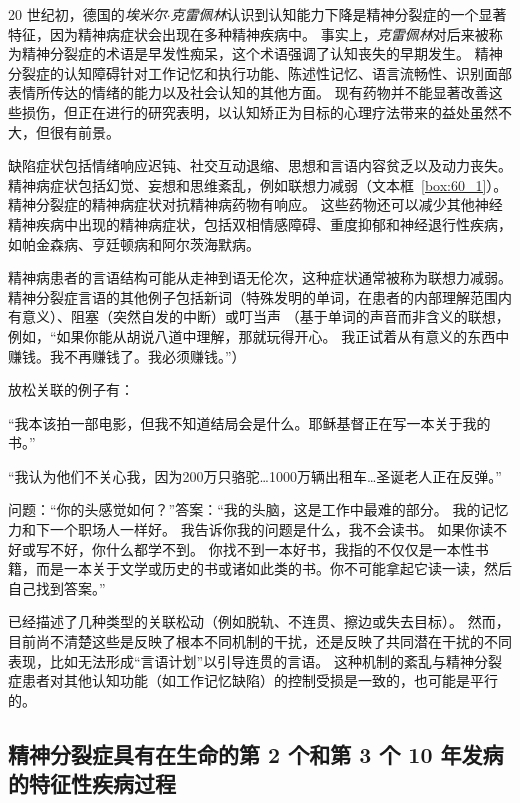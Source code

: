 20 世纪初，德国的\textit{埃米尔$\cdot$克雷佩林}认识到认知能力下降是精神分裂症的一个显著特征，因为精神病症状会出现在多种精神疾病中。
事实上，\textit{克雷佩林}对后来被称为精神分裂症的术语是早发性痴呆，这个术语强调了认知丧失的早期发生。
精神分裂症的认知障碍针对工作记忆和执行功能、陈述性记忆、语言流畅性、识别面部表情所传达的情绪的能力以及社会认知的其他方面。
现有药物并不能显著改善这些损伤，但正在进行的研究表明，以认知矫正为目标的心理疗法带来的益处虽然不大，但很有前景。


缺陷症状包括情绪响应迟钝、社交互动退缩、思想和言语内容贫乏以及动力丧失。
精神病症状包括幻觉、妄想和思维紊乱，例如联想力减弱（文本框~\ref{box:60_1}）。
精神分裂症的精神病症状对抗精神病药物有响应。
这些药物还可以减少其他神经精神疾病中出现的精神病症状，包括双相情感障碍、重度抑郁和神经退行性疾病，如帕金森病、亨廷顿病和阿尔茨海默病。


\begin{proposition}[思维障碍] \label{box:60_1}
	
	\quad \quad 精神病患者的言语结构可能从走神到语无伦次，这种症状通常被称为联想力减弱。
	精神分裂症言语的其他例子包括新词（特殊发明的单词，在患者的内部理解范围内有意义）、阻塞（突然自发的中断）或叮当声
   （基于单词的声音而非含义的联想，例如，“如果你能从胡说八道中理解，那就玩得开心。
	我正试着从有意义的东西中赚钱。我不再赚钱了。我必须赚钱。”）
	
	\quad \quad 放松关联的例子有：
	
	\quad \quad “我本该拍一部电影，但我不知道结局会是什么。耶稣基督正在写一本关于我的书。”
	
	\quad \quad “我认为他们不关心我，因为200万只骆驼…1000万辆出租车…圣诞老人正在反弹。”
	
	\quad \quad 问题：“你的头感觉如何？”答案：“我的头脑，这是工作中最难的部分。
	我的记忆力和下一个职场人一样好。
	我告诉你我的问题是什么，我不会读书。
	如果你读不好或写不好，你什么都学不到。
	你找不到一本好书，我指的不仅仅是一本性书籍，而是一本关于文学或历史的书或诸如此类的书。你不可能拿起它读一读，然后自己找到答案。”
	
	\quad \quad 已经描述了几种类型的关联松动（例如脱轨、不连贯、擦边或失去目标）。
	然而，目前尚不清楚这些是反映了根本不同机制的干扰，还是反映了共同潜在干扰的不同表现，比如无法形成“言语计划”以引导连贯的言语。
	这种机制的紊乱与精神分裂症患者对其他认知功能（如工作记忆缺陷）的控制受损是一致的，也可能是平行的。

\end{proposition}




\subsection{精神分裂症具有在生命的第 2 个和第 3 个 10 年发病的特征性疾病过程}

